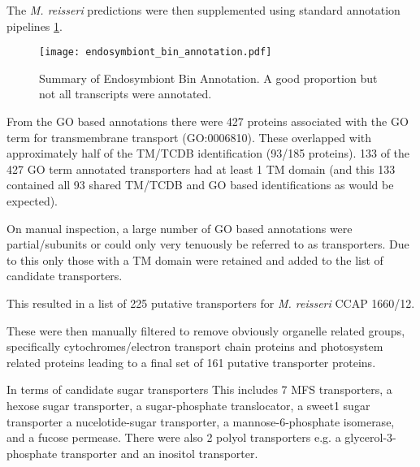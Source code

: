 The \textit{M. reisseri} predictions were then supplemented using standard
annotation pipelines \cref{fig:endo_annot}.


\begin{figure}
    \centering
    \texttt{[image: endosymbiont\_bin\_annotation.pdf]}
    \caption[Summary of \textit{M. reisseri} endosymbiont bin annotation]{Summary
    of Endosymbiont Bin Annotation. A good proportion but not all transcripts
were annotated.} 
\label{fig:endo_annot}
\end{figure}




From the GO based annotations there were 427 proteins associated
with the GO term for transmembrane transport (GO:0006810).
These overlapped with approximately half of the TM/TCDB identification 
(93/185 proteins).  133 of the 427 GO term annotated transporters
had at least 1 TM domain (and this 133 contained all 93 shared TM/TCDB and GO 
based identifications as would be expected). 

On manual inspection, a large number of GO based annotations were partial/subunits
or could only very tenuously be referred to as transporters. 
Due to this only those with a TM domain were retained and added to the list
of candidate transporters. 

This resulted in a list of 225 putative transporters 
for \textit{M. reisseri} CCAP 1660/12.

These were then manually filtered to remove obviously organelle
related groups, specifically cytochromes/electron transport chain
proteins and photosystem related proteins leading to a final
set of 161 putative transporter proteins.


In terms of candidate sugar transporters 
This includes 7 MFS transporters, a hexose sugar transporter, 
a sugar-phosphate translocator, a sweet1 sugar transporter
a nucelotide-sugar transporter, a mannose-6-phosphate isomerase,
and a fucose permease. 
There were also 2 polyol transporters e.g. a glycerol-3-phosphate transporter
and an inositol transporter.


